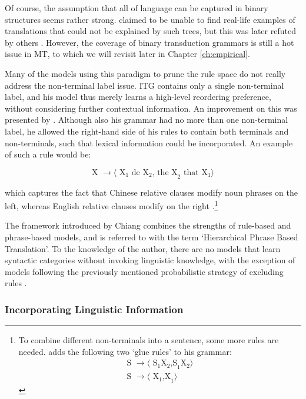 Of course, the assumption that all of language can be captured in binary structures seems rather strong. \citeauthor{wu1997stochastic} claimed to be unable to find real-life examples of translations that could not be explained by such trees, but this was later refuted by others \citep[e.g.,][]{galley2004s}. However, the coverage of binary transduction grammars is still a hot issue in MT, to which we will revisit later in Chapter \ref{ch:empirical}. 

Many of the models using this paradigm to prune the rule space do not really address the non-terminal label issue.  ITG contains only a single non-terminal label, and his model thus merely learns a high-level reordering preference, without considering further contextual information. An improvement on this was presented by \cite{chiang2005hierarchical,chiang2007hierarchical}. Although also his grammar had no more than one non-terminal label, he allowed the right-hand side of his rules to contain both terminals and non-terminals, such that lexical information could be incorporated. An example of such a rule would be:

\[
\text{X } \rightarrow \langle\text{ X}_1 \text{ de X}_2 \text{, the X}_2 \text{ that X}_1\rangle
\]

\noindent which captures the fact that Chinese relative clauses modify noun phrases on the left, whereas English relative clauses modify on the right \citep{chiang2007hierarchical}.\footnote{To combine different non-terminals into a sentence, some more rules are needed. \cite{chiang2007hierarchical} adds the following two `glue rules' to his grammar:\begin{align*}
 \text{S } \rightarrow \langle\text{ S}_1\text{X}_2 \text{,S}_1\text{X}_2\rangle\\
\text{S } \rightarrow \langle\text{ X}_1 \text{,X}_1\rangle 
\end{align*}

}

The framework introduced by Chiang combines the strengths of rule-based and phrase-based models, and is referred to with the term `Hierarchical Phrase Based Translation'. To the knowledge of the author, there are no models that learn syntactic categories without invoking linguistic knowledge, with the exception of models following the previously mentioned probabilistic strategy of excluding rules \citep[e.g.,]{mylonakis2010learning,blunsom2008bayesian}.


\subsubsection{Incorporating Linguistic Information}

